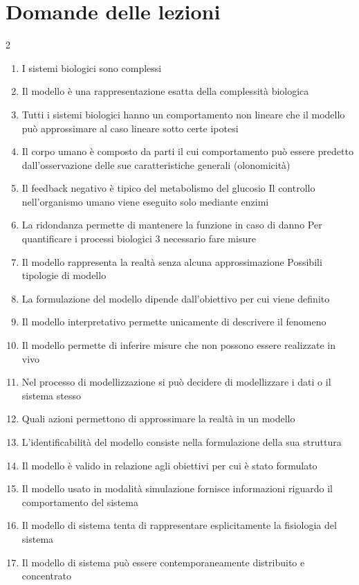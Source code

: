 \appendix
\chapter{Domande delle lezioni}
\begin{multicols}{2}
\begin{enumerate}
    \item I sistemi biologici sono complessi 
    \item Il modello è una rappresentazione esatta della complessità biologica  
    \item Tutti i sistemi biologici hanno un comportamento non lineare che il modello può approssimare al caso lineare sotto certe ipotesi 
    \item Il corpo umano è composto da parti il cui comportamento può essere predetto dall'osservazione delle sue caratteristiche generali (olonomicità)
    \item Il feedback negativo è tipico del metabolismo del glucosio  Il controllo nell'organismo umano viene eseguito solo mediante enzimi 
    \item La ridondanza permette di mantenere la funzione in caso di danno  Per quantificare i processi biologici 3 necessario fare misure 
    \item Il modello rappresenta la realtà senza alcuna approssimazione Possibili tipologie di modello 
    \item La formulazione del modello dipende dall'obiettivo per cui viene definito
    \item Il modello interpretativo permette unicamente di descrivere il fenomeno
    \item Il modello permette di inferire misure che non possono essere realizzate in vivo  
    \item Nel processo di modellizzazione si può decidere di modellizzare i dati o il sistema stesso 
    \item Quali azioni permettono di approssimare la realtà in un modello  
    \item L'identificabilità del modello consiste nella formulazione della sua struttura  
    \item Il modello è valido in relazione agli obiettivi per cui è stato formulato  
    \item Il modello usato in modalità simulazione fornisce informazioni riguardo il comportamento del sistema
    \item Il modello di sistema tenta di rappresentare esplicitamente la fisiologia del sistema 
    \item Il modello di sistema può essere contemporaneamente distribuito e concentrato 

\end{enumerate}
\end{multicols}
